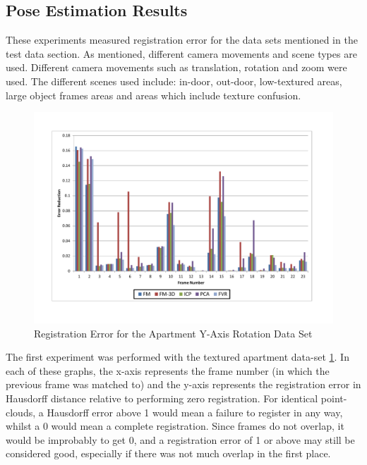 
\subsection{Pose Estimation Results}

These experiments measured registration error for the data sets mentioned in the test data section. As mentioned, different camera movements and scene types are used. Different camera movements such as translation, rotation and zoom were used. The different scenes used include: in-door, out-door, low-textured areas, large object frames areas and areas which include texture confusion. \\


\begin{figure}[t]
\centering
\includegraphics[width=6.0in]{images/results/Apartment_Texture_Rotate}
\caption{Registration Error for the Apartment Y-Axis Rotation Data Set}
\label{fig:PET0}
\end{figure}

The first experiment was performed with the textured apartment data-set \ref{fig:PET0}. In each of these graphs, the x-axis represents the frame number (in which the previous frame was matched to) and the y-axis represents the registration error in Hausdorff distance relative to performing zero registration. For identical point-clouds, a Hausdorff error above 1 would mean a failure to register in any way, whilst a 0 would mean a complete registration. Since frames do not overlap, it would be improbably to get 0, and a registration error of 1 or above may still be considered good, especially if there was not much overlap in the first place. \\


